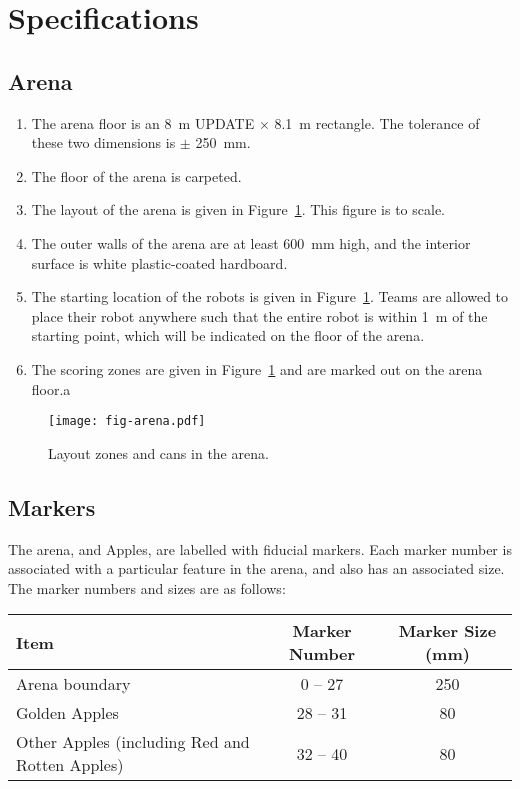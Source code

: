 \section{Specifications}
\label{sec:specs}

\subsection{Arena}
\label{spec:arena}

\begin{enumerate}
  \item The arena floor is an \SI{8}{m} UPDATE $\times$ \SI{8.1}{m} rectangle. The
        tolerance of these two dimensions is $\pm$ \SI{250}{mm}.
  \item The floor of the arena is carpeted.
  \item The layout of the arena is given in Figure~\ref{fig:arena}. This
        figure is to scale.
  \item The outer walls of the arena are at least \SI{600}{mm} high, and the
        interior surface is white plastic-coated hardboard.
  \item The starting location of the robots is given in Figure~\ref{fig:arena}.
        Teams are allowed to place their robot anywhere such that the entire
        robot is within \SI{1}{m} of the starting point, which will be
        indicated on the floor of the arena.
  \item The scoring zones are given in Figure~\ref{fig:arena} and are marked out
        on the arena floor.a
\end{enumerate}

\begin{figure}
  \texttt{[image: fig-arena.pdf]}
  \caption{Layout zones and cans in the arena.}
  \label{fig:arena}
\end{figure}

\subsection{Markers}
\label{spec:markers}

The arena, and Apples, are labelled with fiducial markers. Each
marker number is associated with a particular feature in the arena,
and also has an associated size.  The marker numbers and sizes are
as follows:

\begin{center}
\begin{tabular}{lcc}
  \toprule
  \textbf{Item} & \textbf{Marker Number} & \textbf{Marker Size (\si{mm})} \\
  \midrule
  Arena boundary  &     0 -- 27   &   250 \\
  Golden Apples   &     28 -- 31  &   80  \\
  Other Apples (including Red and Rotten Apples) & 32 -- 40 & 80 \\
  \bottomrule
\end{tabular}
\end{center}

